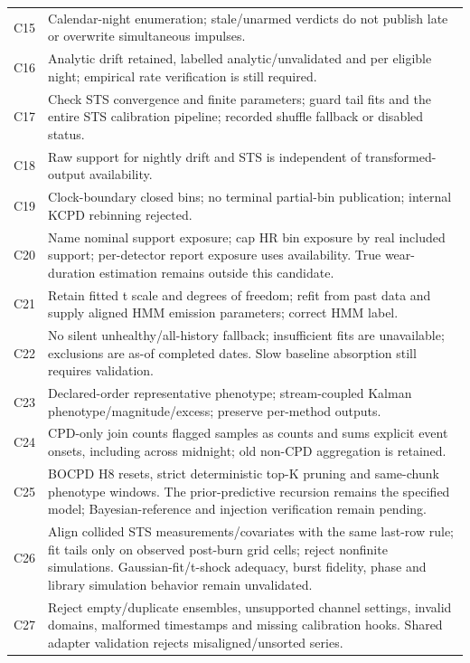 \documentclass[11pt,a4paper]{article}
\begin{document}
\begin{longtable}{@{}p{}p{}@{}}
C15 & Calendar-night enumeration; stale/unarmed verdicts do not publish late or overwrite simultaneous impulses. \\
C16 & Analytic drift retained, labelled analytic/unvalidated and per eligible night; empirical rate verification is still required. \\
C17 & Check STS convergence and finite parameters; guard tail fits and the entire STS calibration pipeline; recorded shuffle fallback or disabled status. \\
C18 & Raw support for nightly drift and STS is independent of transformed-output availability. \\
C19 & Clock-boundary closed bins; no terminal partial-bin publication; internal KCPD rebinning rejected. \\
C20 & Name nominal support exposure; cap HR bin exposure by real included support; per-detector report exposure uses availability. True wear-duration estimation remains outside this candidate. \\
C21 & Retain fitted t scale and degrees of freedom; refit from past data and supply aligned HMM emission parameters; correct HMM label. \\
C22 & No silent unhealthy/all-history fallback; insufficient fits are unavailable; exclusions are as-of completed dates. Slow baseline absorption still requires validation. \\
C23 & Declared-order representative phenotype; stream-coupled Kalman phenotype/magnitude/excess; preserve per-method outputs. \\
C24 & CPD-only join counts flagged samples as counts and sums explicit event onsets, including across midnight; old non-CPD aggregation is retained. \\
C25 & BOCPD H8 resets, strict deterministic top-K pruning and same-chunk phenotype windows. The prior-predictive recursion remains the specified model; Bayesian-reference and injection verification remain pending. \\
C26 & Align collided STS measurements/covariates with the same last-row rule; fit tails only on observed post-burn grid cells; reject nonfinite simulations. Gaussian-fit/t-shock adequacy, burst fidelity, phase and library simulation behavior remain unvalidated. \\
C27 & Reject empty/duplicate ensembles, unsupported channel settings, invalid domains, malformed timestamps and missing calibration hooks. Shared adapter validation rejects misaligned/unsorted series. \\

\end{longtable}
\end{document}
